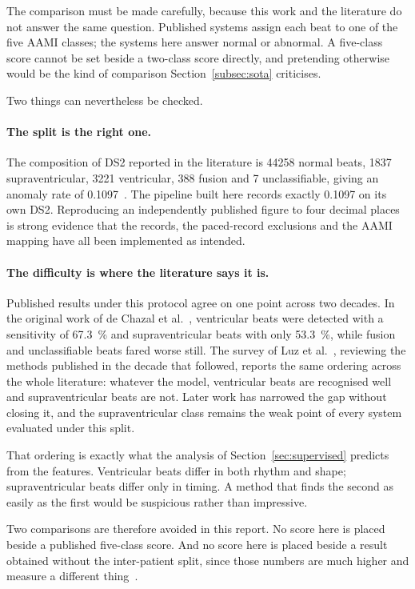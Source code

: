 \documentclass[a4paper, 12pt]{article}
\begin{document}
The comparison must be made carefully, because this work and the literature do not
answer the same question. Published systems assign each beat to one of the five
AAMI classes; the systems here answer normal or abnormal. A five-class score cannot
be set beside a two-class score directly, and pretending otherwise would be the
kind of comparison Section~\ref{subsec:sota} criticises.

Two things can nevertheless be checked.

\paragraph{The split is the right one.} The composition of DS2 reported in the
literature is \num{44258} normal beats, \num{1837} supraventricular, \num{3221}
ventricular, \num{388} fusion and \num{7} unclassifiable, giving an anomaly rate
of \num{0.1097}~\cite{dechazal2004}. The pipeline built here records exactly
\num{0.1097} on its own DS2. Reproducing an independently published figure to four
decimal places is strong evidence that the records, the paced-record exclusions and
the AAMI mapping have all been implemented as intended.

\paragraph{The difficulty is where the literature says it is.} Published results
under this protocol agree on one point across two decades. In the original work of
de Chazal et al.~\cite{dechazal2004}, ventricular beats were detected with a
sensitivity of \SI{67.3}{\percent} and supraventricular beats with only
\SI{53.3}{\percent}, while fusion and unclassifiable beats fared worse still. The
survey of Luz et al.~\cite{luz2016survey}, reviewing the methods published in the
decade that followed, reports the same ordering across the whole literature:
whatever the model, ventricular beats are recognised well and supraventricular
beats are not. Later work has narrowed the gap without closing it, and the
supraventricular class remains the weak point of every system evaluated under
this split.

That ordering is exactly what the analysis of Section~\ref{sec:supervised}
predicts from the features. Ventricular beats differ in both rhythm and shape;
supraventricular beats differ only in timing. A method that finds the second as
easily as the first would be suspicious rather than impressive.

Two comparisons are therefore avoided in this report. No score here is placed
beside a published five-class score. And no score here is placed beside a result
obtained without the inter-patient split, since those numbers are much higher and
measure a different thing~\cite{luz2016survey}.
\end{document}
